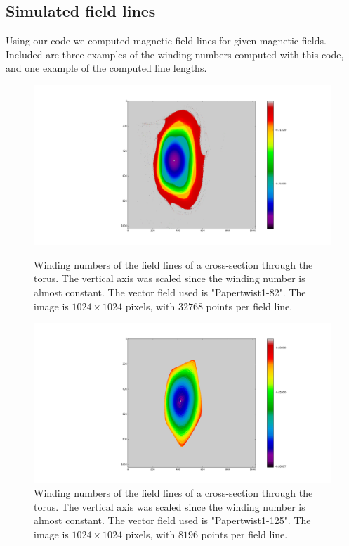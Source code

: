 \documentclass{article}
\begin{document}
\subsection{Simulated field lines}
Using our code we computed magnetic field lines for given magnetic fields. Included are three examples of the winding numbers computed with this code, and one example of the computed line lengths.


\begin{figure}[!htb]
  \includegraphics[width=\linewidth]{Figures/Rings_Papertwist_twist1_82_steps32k.png}
  \caption{Winding numbers of the field lines of a cross-section through the torus. The vertical axis was scaled since the winding number is almost constant. The vector field used is "Papertwist1-82". The image is $1024\times 1024$ pixels, with $32768$ points per field line.}\label{fig:82-32k}
\endminipage\hfill
{}
  \includegraphics[width=\linewidth]{Figures/Rings_Papertwist_twist1_125_steps8k.png}
  \caption{Winding numbers of the field lines of a cross-section through the torus. The vertical axis was scaled since the winding number is almost constant. The vector field used is "Papertwist1-125". The image is $1024\times 1024$ pixels, with $8196$ points per field line.}\label{fig:125-8k}

\end{figure}
\end{document}
